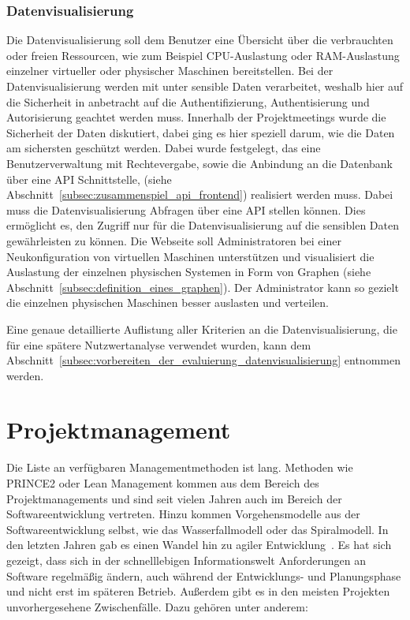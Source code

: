 \subsection{Datenvisualisierung}
Die Datenvisualisierung soll dem Benutzer eine Übersicht über die verbrauchten
oder freien Ressourcen, wie zum Beispiel CPU\hyp{}Auslastung oder
RAM\hyp{}Auslastung einzelner virtueller oder physischer Maschinen
bereitstellen. Bei der Datenvisualisierung werden mit unter sensible Daten
verarbeitet, weshalb hier auf die Sicherheit in anbetracht auf die
Authentifizierung, Authentisierung und Autorisierung geachtet werden muss.
Innerhalb der Projektmeetings wurde die Sicherheit der Daten diskutiert, dabei
ging es hier speziell darum, wie die Daten am sichersten geschützt werden.
Dabei wurde festgelegt, das eine Benutzerverwaltung mit Rechtevergabe, sowie
die Anbindung an die Datenbank über eine \gls{API} Schnittstelle, (siehe
Abschnitt~\ref{subsec:zusammenspiel_api_frontend}) realisiert werden muss.
Dabei muss die Datenvisualisierung Abfragen über eine \gls{API} stellen können.
Dies ermöglicht es, den Zugriff nur für die Datenvisualisierung auf die
sensiblen Daten gewährleisten zu können. Die Webseite soll Administratoren
bei einer Neukonfiguration von virtuellen Maschinen unterstützen und
visualisiert die Auslastung der einzelnen physischen Systemen in Form von
Graphen (siehe Abschnitt~\ref{subsec:definition_eines_graphen}). Der
Administrator kann so gezielt die einzelnen physischen Maschinen besser
auslasten und verteilen.

Eine genaue detaillierte Auflistung aller Kriterien an die Datenvisualisierung,
die für eine spätere Nutzwertanalyse verwendet wurden, kann dem
Abschnitt~\ref{subsec:vorbereiten_der_evaluierung_datenvisualisierung}
entnommen werden.
\mr%

\chapter{Projektmanagement}
Die Liste an verfügbaren Managementmethoden ist lang. Methoden wie PRINCE2 oder
Lean Management kommen aus dem Bereich des Projektmanagements und sind seit
vielen Jahren auch im Bereich der Softwareentwicklung vertreten. Hinzu kommen
Vorgehensmodelle aus der Softwareentwicklung selbst, wie das Wasserfallmodell
oder das Spiralmodell. In den letzten Jahren gab es einen Wandel hin zu agiler
Entwicklung~\cite{beck2001manifesto}. Es hat sich gezeigt, dass sich in der
schnelllebigen Informationswelt Anforderungen an Software regelmäßig ändern,
auch während der Entwicklungs- und Planungsphase und nicht erst im späteren
Betrieb. Außerdem gibt es in den meisten Projekten unvorhergesehene
Zwischenfälle. Dazu gehören unter anderem:

